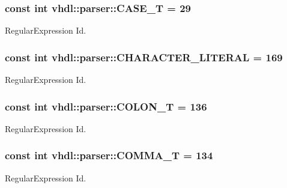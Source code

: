 \subsubsection[{C\+A\+S\+E\+\_\+\+T}]{\setlength{\rightskip}{0pt plus 5cm}const int vhdl\+::parser\+::\+C\+A\+S\+E\+\_\+\+T = 29}\label{namespacevhdl_1_1parser_ae07e8aa6d70c9db2046bd3fc972aa63c}
Regular\+Expression Id. \hypertarget{namespacevhdl_1_1parser_a0ea0781ca546144328fe029f9b63ae59}{}
\subsubsection[{C\+H\+A\+R\+A\+C\+T\+E\+R\+\_\+\+L\+I\+T\+E\+R\+A\+L}]{\setlength{\rightskip}{0pt plus 5cm}const int vhdl\+::parser\+::\+C\+H\+A\+R\+A\+C\+T\+E\+R\+\_\+\+L\+I\+T\+E\+R\+A\+L = 169}\label{namespacevhdl_1_1parser_a0ea0781ca546144328fe029f9b63ae59}
Regular\+Expression Id. \hypertarget{namespacevhdl_1_1parser_a04713af1eaa29bb44ef5cf594864e658}{}
\subsubsection[{C\+O\+L\+O\+N\+\_\+\+T}]{\setlength{\rightskip}{0pt plus 5cm}const int vhdl\+::parser\+::\+C\+O\+L\+O\+N\+\_\+\+T = 136}\label{namespacevhdl_1_1parser_a04713af1eaa29bb44ef5cf594864e658}
Regular\+Expression Id. \hypertarget{namespacevhdl_1_1parser_ac5d88c226ed1526c4d58382c3944fb46}{}
\subsubsection[{C\+O\+M\+M\+A\+\_\+\+T}]{\setlength{\rightskip}{0pt plus 5cm}const int vhdl\+::parser\+::\+C\+O\+M\+M\+A\+\_\+\+T = 134}\label{namespacevhdl_1_1parser_ac5d88c226ed1526c4d58382c3944fb46}
Regular\+Expression Id. \hypertarget{namespacevhdl_1_1parser_ac00ecd8f252f371ac88205ac5da3df13}{}
